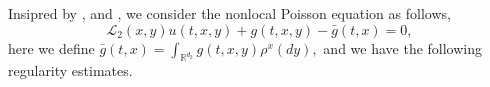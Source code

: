 \documentclass[11pt,reqno]{amsart}
\numberwithin{equation}{section}
\begin{document}

Insipred by \cite{RX}, \cite{SXX} and \cite{KY}, we consider the nonlocal Poisson equation as follows, %
\begin{equation}\label{5.1-1}
	\mathcal{L}_{2}(x,y)u(t,x,y)+g(t,x,y)-\bar{g}(t,x)=0,
\end{equation}
here we define $ 
\bar{g}(t,x)=\int_{\mathbb{R}^{d_{2}}}g(t,x,y)\rho^{x}(dy),$
and we have the following regularity estimates.
\end{document}
